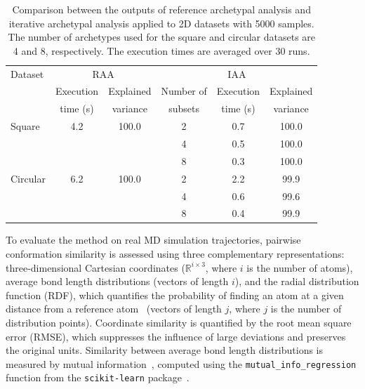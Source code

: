 \documentclass{WileyMSP-template}
\begin{document}
\begin{table}[t]
\caption{Comparison between the outputs of reference archetypal analysis and iterative archetypal analysis applied to 2D datasets with 5000 samples. The number of archetypes used for the square and circular datasets are 4 and 8, respectively. The execution times are averaged over 30 runs.}
\centering
\small
\begin{tabular}[width=\textwidth]{l|cc|ccc}
\hline
Dataset & \multicolumn{2}{c|}{RAA} & \multicolumn{3}{c}{IAA}            \\
         & Execution & Explained    & Number of & Execution & Explained \\
         & time (s)  & variance     & subsets   & time (s)  & variance  \\
\hline
Square   & 4.2       & 100.0        & 2         & 0.7       & 100.0     \\
         &           &              & 4         & 0.5       & 100.0     \\
         &           &              & 8         & 0.3       & 100.0     \\
Circular & 6.2       & 100.0        & 2         & 2.2       &  99.9     \\
         &           &              & 4         & 0.6       &  99.6     \\
         &           &              & 8         & 0.4       &  99.9     \\
\hline
\end{tabular}
\label{tab:redRed2DdataEval}
\end{table}

To evaluate the method on real MD simulation trajectories, pairwise conformation similarity is assessed using three complementary representations: three-dimensional Cartesian coordinates ($\mathbb{R}^{i \times 3}$, where $i$ is the number of atoms), average bond length distributions (vectors of length $i$), and the radial distribution function (RDF), which quantifies the probability of finding an atom at a given distance from a reference atom~\cite{Liu2018NPRDF} (vectors of length $j$, where $j$ is the number of distribution points). Coordinate similarity is quantified by the root mean square error (RMSE), which suppresses the influence of large deviations and preserves the original units. Similarity between average bond length distributions is measured by mutual information~\cite{Kinney2014MI}, computed using the \texttt{mutual\_info\_regression} function from the \texttt{scikit-learn} package~\cite{Pedregosa2011sklearn}.
\end{document}
